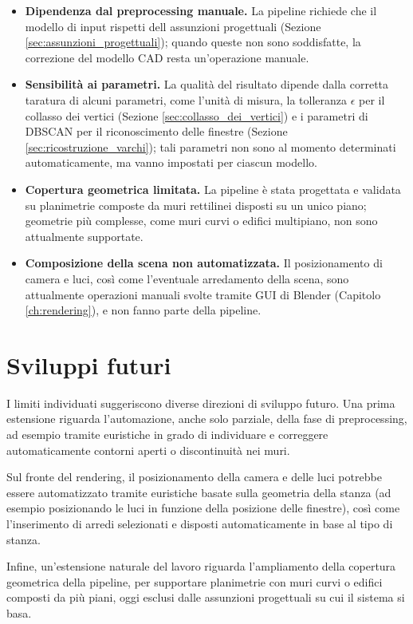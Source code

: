 \begin{itemize}
	\item \textbf{Dipendenza dal preprocessing manuale.} La pipeline richiede che il modello di input rispetti dell assunzioni progettuali (Sezione \ref{sec:assunzioni_progettuali}); quando queste non sono soddisfatte, la correzione del modello CAD resta un'operazione manuale.
	
	\item \textbf{Sensibilità ai parametri.} La qualità del risultato dipende dalla corretta taratura di alcuni parametri, come l'unità di misura, la tolleranza $\epsilon$ per il collasso dei vertici (Sezione \ref{sec:collasso_dei_vertici}) e i parametri di DBSCAN per il riconoscimento delle finestre (Sezione \ref{sec:ricostruzione_varchi}); tali parametri non sono al momento determinati automaticamente, ma vanno impostati per ciascun modello.
	
	\item \textbf{Copertura geometrica limitata.} La pipeline è stata progettata e validata su planimetrie composte da muri rettilinei disposti su un unico piano; geometrie più complesse, come muri curvi o edifici multipiano, non sono attualmente supportate.
	
	\item \textbf{Composizione della scena non automatizzata.} Il posizionamento di camera e luci, così come l'eventuale arredamento della scena, sono attualmente operazioni manuali svolte tramite GUI di Blender (Capitolo \ref{ch:rendering}), e non fanno parte della pipeline.
\end{itemize}

\section{Sviluppi futuri}
\label{sec:sviluppi_futuri}

I limiti individuati suggeriscono diverse direzioni di sviluppo futuro. Una prima estensione riguarda l'automazione, anche solo parziale, della fase di preprocessing, ad esempio tramite euristiche in grado di individuare e correggere automaticamente contorni aperti o discontinuità nei muri. 

Sul fronte del rendering, il posizionamento della camera e delle luci potrebbe essere automatizzato tramite euristiche basate sulla geometria della stanza (ad esempio posizionando le luci in funzione della posizione delle finestre), così come l'inserimento di arredi selezionati e disposti automaticamente in base al tipo di stanza.

Infine, un'estensione naturale del lavoro riguarda l'ampliamento della copertura geometrica della pipeline, per supportare planimetrie con muri curvi o edifici composti da più piani, oggi esclusi dalle assunzioni progettuali su cui il sistema si basa.
